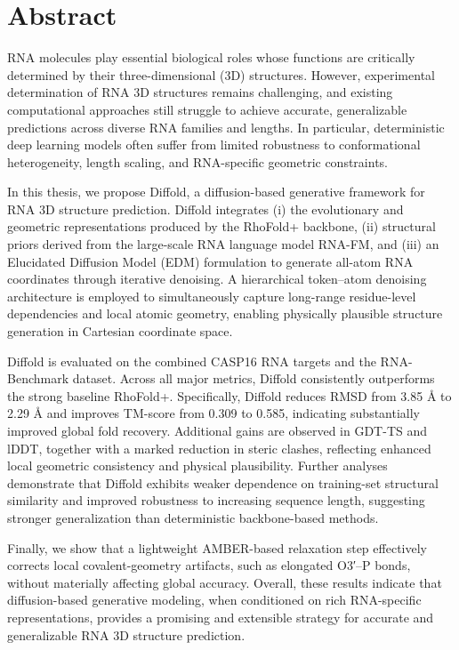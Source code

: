 \chapter*{Abstract}
\thispagestyle{empty}
RNA molecules play essential biological roles whose functions are critically determined by their three-dimensional (3D) structures. However, experimental determination of RNA 3D structures remains challenging, and existing computational approaches still struggle to achieve accurate, generalizable predictions across diverse RNA families and lengths. In particular, deterministic deep learning models often suffer from limited robustness to conformational heterogeneity, length scaling, and RNA-specific geometric constraints.

In this thesis, we propose Diffold, a diffusion-based generative framework for RNA 3D structure prediction. Diffold integrates (i) the evolutionary and geometric representations produced by the RhoFold+ backbone, (ii) structural priors derived from the large-scale RNA language model RNA-FM, and (iii) an Elucidated Diffusion Model (EDM) formulation to generate all-atom RNA coordinates through iterative denoising. A hierarchical token–atom denoising architecture is employed to simultaneously capture long-range residue-level dependencies and local atomic geometry, enabling physically plausible structure generation in Cartesian coordinate space.

Diffold is evaluated on the combined CASP16 RNA targets and the RNA-Benchmark dataset. Across all major metrics, Diffold consistently outperforms the strong baseline RhoFold+. Specifically, Diffold reduces RMSD from 3.85 $\text{\AA}$ to 2.29 $\text{\AA}$ and improves TM-score from 0.309 to 0.585, indicating substantially improved global fold recovery. Additional gains are observed in GDT-TS and lDDT, together with a marked reduction in steric clashes, reflecting enhanced local geometric consistency and physical plausibility. Further analyses demonstrate that Diffold exhibits weaker dependence on training-set structural similarity and improved robustness to increasing sequence length, suggesting stronger generalization than deterministic backbone-based methods.

Finally, we show that a lightweight AMBER-based relaxation step effectively corrects local covalent-geometry artifacts, such as elongated O3′–P bonds, without materially affecting global accuracy. Overall, these results indicate that diffusion-based generative modeling, when conditioned on rich RNA-specific representations, provides a promising and extensible strategy for accurate and generalizable RNA 3D structure prediction.